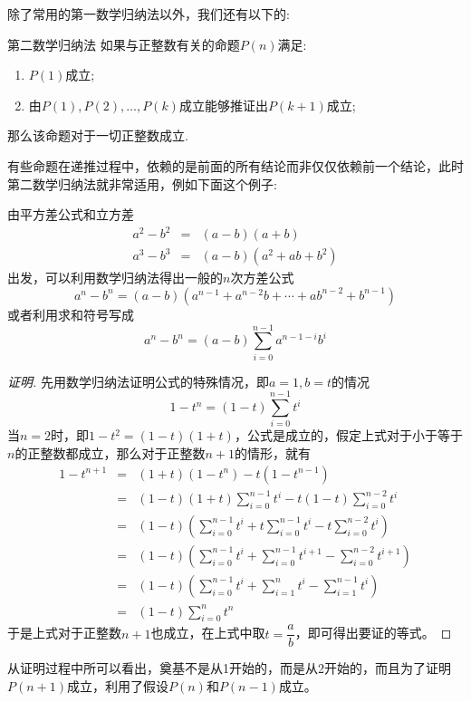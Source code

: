 除了常用的第一数学归纳法以外，我们还有以下的:
\begin{myprinciple}{第二数学归纳法}{}{\label{thm:mathematical-induction-2}}
如果与正整数有关的命题$P(n)$满足:
  \begin{enumerate}
  \item $P(1)$成立;
  \item 由$P(1),P(2),\dots,P(k)$成立能够推证出$P(k+1)$成立;
  \end{enumerate}
那么该命题对于一切正整数成立.
\end{myprinciple}
有些命题在递推过程中，依赖的是前面的所有结论而非仅仅依赖前一个结论，此时第二数学归纳法就非常适用，例如下面这个例子:

\begin{example}
  \label{example:a-power-n-b-power-n-factoring}
  由平方差公式和立方差
  \begin{eqnarray*}
    a^2-b^2 & = & (a-b)(a+b) \\
    a^3-b^3 & = & (a-b)(a^2+ab+b^2)
  \end{eqnarray*}
  出发，可以利用数学归纳法得出一般的$n$次方差公式
  \[ a^n - b^n = (a-b)(a^{n-1}+a^{n-2}b+\cdots+ab^{n-2}+b^{n-1}) \]
  或者利用求和符号写成
  \[ a^n-b^n = (a-b)\sum_{i=0}^{n-1}a^{n-1-i}b^i \]
  \begin{proof}[证明]
    先用数学归纳法证明公式的特殊情况，即$a=1,b=t$的情况
    \[ 1-t^n = (1-t)\sum_{i=0}^{n-1}t^i \]
    当$n=2$时，即$1-t^2=(1-t)(1+t)$，公式是成立的，假定上式对于小于等于$n$的正整数都成立，那么对于正整数$n+1$的情形，就有
    \begin{eqnarray*}
      1-t^{n+1} & = & (1+t)(1-t^n)-t(1-t^{n-1}) \\
                & = & (1-t)(1+t)\sum_{i=0}^{n-1}t^i - t(1-t)\sum_{i=0}^{n-2}t^i \\
                & = & (1-t) \left( \sum_{i=0}^{n-1}t^i + t\sum_{i=0}^{n-1}t^i -t\sum_{i=0}^{n-2}t^i \right) \\
                & = & (1-t) \left( \sum_{i=0}^{n-1}t^i + \sum_{i=0}^{n-1}t^{i+1} -\sum_{i=0}^{n-2}t^{i+1} \right) \\
                & = & (1-t) \left( \sum_{i=0}^{n-1}t^i + \sum_{i=1}^{n}t^{i} -\sum_{i=1}^{n-1}t^{i} \right) \\
      & = & (1-t)\sum_{i=0}^nt^n
    \end{eqnarray*}
    于是上式对于正整数$n+1$也成立，在上式中取$t=\dfrac{a}{b}$，即可得出要证的等式。
  \end{proof}

  从证明过程中所可以看出，奠基不是从1开始的，而是从2开始的，而且为了证明$P(n+1)$成立，利用了假设$P(n)$和$P(n-1)$成立。
\end{example}

